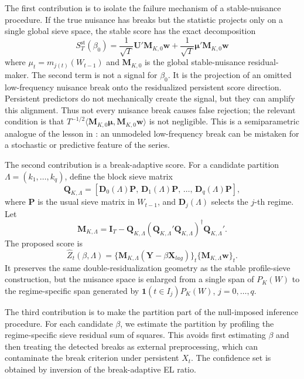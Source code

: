 \documentclass[12pt]{article} %
\numberwithin{equation}{section}
\theoremstyle{definition}
\newcommand{\ind}{\mathbf 1}
\begin{document}
The first contribution is to isolate the failure mechanism of a stable-nuisance procedure. If the true nuisance has breaks but the statistic projects only on a single global sieve space, the stable score has the exact decomposition
\[
    S_T^{\mathrm{st}}(\beta_0)
    =
    \frac1{\sqrt T}\bm U'\bm M_{K,0}\bm w
    +
    \frac1{\sqrt T}\bm\mu'\bm M_{K,0}\bm w
\]
where \(\mu_t=m_{j(t)}(W_{t-1})\) and \(\bm M_{K,0}\) is the global stable-nuisance residual-maker. The second term is not a signal for \(\beta_0\). It is the projection of an omitted low-frequency nuisance break onto the residualized persistent score direction. Persistent predictors do not mechanically create the signal, but they can amplify this alignment. Thus not every nuisance break causes false rejection; the relevant condition is that \(T^{-1/2}\langle \bm M_{K,0}\bm\mu,\bm M_{K,0}\bm w\rangle\) is not negligible. This is a semiparametric analogue of the lesson in \citet{Perron1989}: an unmodeled low-frequency break can be mistaken for a stochastic or predictive feature of the series.

The second contribution is a break-adaptive score. For a candidate partition \(\Lambda=(k_1,\ldots,k_q)\), define the block sieve matrix
\[
    \bm Q_{K,\Lambda}
    =
    \left[
    \bm D_0(\Lambda)\bm P,\,
    \bm D_1(\Lambda)\bm P,\,
    \ldots,\,
    \bm D_q(\Lambda)\bm P
    \right],
\]
where \(\bm P\) is the usual sieve matrix in \(W_{t-1}\), and \(\bm D_j(\Lambda)\) selects the \(j\)-th regime. Let
\[
    \bm M_{K,\Lambda}
    =
    \bm I_T
    -
    \bm Q_{K,\Lambda}
    (\bm Q_{K,\Lambda}'\bm Q_{K,\Lambda})^\dagger
    \bm Q_{K,\Lambda}'.
\]
The proposed score is
\[
    \widehat Z_t(\beta,\Lambda)
    =
    \{\bm M_{K,\Lambda}(\bm Y-\beta\bm X_{lag})\}_t
    \{\bm M_{K,\Lambda}\bm w\}_t.
\]
It preserves the same double-residualization geometry as the stable profile-sieve construction, but the nuisance space is enlarged from a single span of \(P_K(W)\) to the regime-specific span generated by \(\ind(t\in I_j)P_K(W)\), \(j=0,\ldots,q\).

The third contribution is to make the partition part of the null-imposed inference procedure. For each candidate \(\beta\), we estimate the partition by profiling the regime-specific sieve residual sum of squares. This avoids first estimating \(\beta\) and then treating the detected breaks as external preprocessing, which can contaminate the break criterion under persistent \(X_t\). The confidence set is obtained by inversion of the break-adaptive EL ratio.
\end{document}
